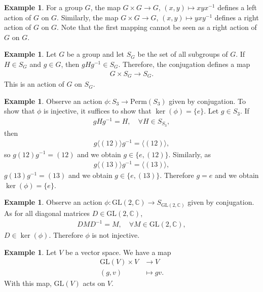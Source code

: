 \documentclass[12pt]{report}
\theoremstyle{plain}
\theoremstyle{remark}
\theoremstyle{definition}
\newtheorem{example}[theorem]{Example}
\newcommand{\C}{\mathbb{C}}
\begin{document}
\begin{example}
    For a group $G$, the map $G\times G\rightarrow G$, $(x,y)\mapsto xyx^{-1}$ defines a left action of $G$ on $G$. Similarly, the map $G\times G\rightarrow G$, $(x,y)\mapsto yxy^{-1}$ defines a right action of $G$ on $G$. Note that the first mapping cannot be seen as a right action of $G$ on $G$.
\end{example}

\begin{example}
    Let $G$ be a group and let $S_G$ be the set of all subgroups of $G$. If $H\in S_G$ and $g\in G$, then $gHg^{-1}\in S_G$. Therefore, the conjugation defines a map
    \begin{align*}
        G\times S_G\rightarrow S_G.
    \end{align*}
    This is an action of $G$ on $S_G$.
\end{example}

\begin{example}
    Observe an action $\phi:S_3\rightarrow \mathrm{Perm}(S_3)$ given by conjugation. To show that $\phi$ is injective, it suffices to show that $\ker(\phi) = \{e\}$. Let $g\in S_3$. If
    \begin{align*}
        gHg^{-1}=H,\quad \forall H\in S_{S_3},
    \end{align*}
     then
     \begin{align*}
         g\langle (12)\rangle g^{-1} = \langle(12)\rangle,
     \end{align*}
     so $g(12)g^{-1} = (12)$ and we obtain $g\in \{e,(12)\}$. Similarly, as
     \begin{align*}
         g\langle(13)\rangle g^{-1}=\langle (13)\rangle,
     \end{align*}
     $g(13)g^{-1}=(13)$ and we obtain $g\in \{e,(13)\}$. Therefore $g=e$ and we obtain $\ker(\phi)=\{e\}$.
\end{example}

\begin{example}
    Observe an action $\phi:\mathrm{GL}(2,\C)\rightarrow S_{\mathrm{GL}(2,\C)}$ given by conjugation. As for all diagonal matrices $D\in\mathrm{GL}(2,\C)$,
    \begin{align*}
        DMD^{-1} = M,\quad \forall M\in\mathrm{GL}(2,\C),
    \end{align*}
    $D\in \ker(\phi)$. Therefore $\phi$ is not injective.
\end{example}

\begin{example}
    Let $V$ be a vector space. We have a map
    \begin{align*}
        \mathrm{GL}(V) \times V & \rightarrow V \\
        (g,v) &\mapsto gv.
    \end{align*}
    With this map, $\mathrm{GL}(V)$ acts on $V$.
\end{example}
\end{document}
